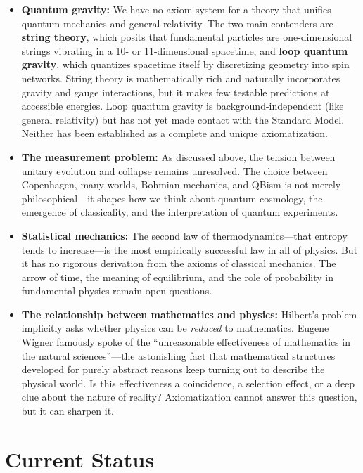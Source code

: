 \begin{itemize}
    \item \textbf{Quantum gravity:} We have no axiom system for a theory that unifies quantum mechanics and general relativity. The two main contenders are \textbf{string theory}, which posits that fundamental particles are one-dimensional strings vibrating in a 10- or 11-dimensional spacetime, and \textbf{loop quantum gravity}, which quantizes spacetime itself by discretizing geometry into spin networks. String theory is mathematically rich and naturally incorporates gravity and gauge interactions, but it makes few testable predictions at accessible energies. Loop quantum gravity is background-independent (like general relativity) but has not yet made contact with the Standard Model. Neither has been established as a complete and unique axiomatization.

    \item \textbf{The measurement problem:} As discussed above, the tension between unitary evolution and collapse remains unresolved. The choice between Copenhagen, many-worlds, Bohmian mechanics, and QBism is not merely philosophical---it shapes how we think about quantum cosmology, the emergence of classicality, and the interpretation of quantum experiments.

    \item \textbf{Statistical mechanics:} The second law of thermodynamics---that entropy tends to increase---is the most empirically successful law in all of physics. But it has no rigorous derivation from the axioms of classical mechanics. The arrow of time, the meaning of equilibrium, and the role of probability in fundamental physics remain open questions.

    \item \textbf{The relationship between mathematics and physics:} Hilbert's problem implicitly asks whether physics can be \emph{reduced} to mathematics. Eugene Wigner famously spoke of the ``unreasonable effectiveness of mathematics in the natural sciences''---the astonishing fact that mathematical structures developed for purely abstract reasons keep turning out to describe the physical world. Is this effectiveness a coincidence, a selection effect, or a deep clue about the nature of reality? Axiomatization cannot answer this question, but it can sharpen it.
\end{itemize}

\section{Current Status}

